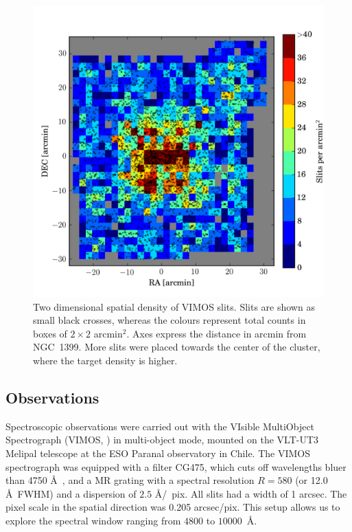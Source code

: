 \documentclass[useAMS,usenatbib]{mn2e}
\begin{document}
\begin{figure}
\centering
\includegraphics[width=\columnwidth]{figures/slitdist.png} 
\caption{Two dimensional spatial density of VIMOS slits. Slits are shown as small black crosses, whereas the colours represent total counts in boxes of $2\times2$ arcmin$^2$. Axes express the distance in arcmin from NGC~1399. More slits were placed towards the center of the cluster, where the target density is higher. }
\label{fig:2dsplit}
\end{figure}

\subsection{Observations}
\label{sec:observations}

Spectroscopic observations were carried out with the VIsible MultiObject Spectrograph (VIMOS, \citealt{LeFevre}) in multi-object mode, mounted on the VLT-UT3 Melipal telescope at the ESO Paranal observatory in Chile. 
The VIMOS spectrograph was equipped with a filter CG475, which cuts off wavelengths bluer than 4750 \AA\ , and a MR grating with a spectral resolution $R = 580$ (or 12.0 \AA\ FWHM) and a dispersion of $2.5$ \AA /~pix. All slits had a width of 1 arcsec. The pixel scale in the spatial direction was 0.205 arcsec/pix. This setup allows us to explore the spectral window ranging from $4800$ to $10000$~\AA. 
\end{document}
